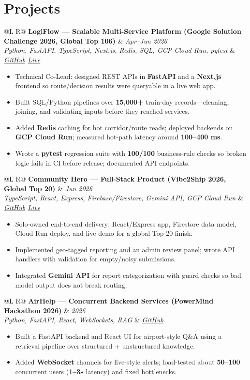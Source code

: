 \documentclass[a4paper,10pt]{article}
\makeatletter
\newcommand{\proj}[4]{%
  \vspace{1.2mm}
  \noindent\begin{tabularx}{\textwidth}{@{}L R@{}}
    \textbf{#1} & \textit{\small #2} \\
    \textit{\small #3} & \textit{\small #4} \\
  \end{tabularx}\par
  \vspace{0.4mm}%
}
\makeatother
\begin{document}
\section{Projects}
\proj{LogiFlow --- Scalable Multi-Service Platform (Google Solution Challenge 2026, Global Top 106)}{Apr--Jun 2026}
{Python, FastAPI, TypeScript, Next.js, Redis, SQL, GCP Cloud Run, pytest}
{\href{https://github.com/Ojas-Srivastava05/LogiFlow-Solution-Challenge-2026}{GitHub} \textbar{} \href{https://logi-flow-solution-challenge-2026.vercel.app}{Live}}
\begin{itemize}
  \item Technical Co-Lead: designed REST APIs in \textbf{FastAPI} and a \textbf{Next.js} frontend so route/decision results were queryable in a live web app.
  \item Built SQL/Python pipelines over \textbf{15,000+} train-day records---cleaning, joining, and validating inputs before they reached services.
  \item Added \textbf{Redis} caching for hot corridor/route reads; deployed backends on \textbf{GCP Cloud Run}; measured hot-path latency around \textbf{100--400 ms}.
  \item Wrote a \textbf{pytest} regression suite with \textbf{100/100} business-rule checks so broken logic fails in CI before release; documented API endpoints.
\end{itemize}

\proj{Community Hero --- Full-Stack Product (Vibe2Ship 2026, Global Top 20)}{Jun 2026}
{TypeScript, React, Express, Firebase/Firestore, Gemini API, GCP Cloud Run}
{\href{https://github.com/Ojas-Srivastava05/community-hero}{GitHub} \textbar{} \href{https://community-hero-987477089222.asia-south1.run.app}{Live}}
\begin{itemize}
  \item Solo-owned end-to-end delivery: React/Express app, Firestore data model, Cloud Run deploy, and live demo for a global Top-20 finish.
  \item Implemented geo-tagged reporting and an admin review panel; wrote API handlers with validation for empty/noisy submissions.
  \item Integrated \textbf{Gemini API} for report categorization with guard checks so bad model output does not break routing.
\end{itemize}

\proj{AirHelp --- Concurrent Backend Services (PowerMind Hackathon 2026)}{2026}
{Python, FastAPI, React, WebSockets, RAG}
{\href{https://github.com/Ojas-Srivastava05/AirHelp-AI-Airport-Assistant}{GitHub}}
\begin{itemize}
  \item Built a FastAPI backend and React UI for airport-style Q\&A using a retrieval pipeline over structured + unstructured knowledge.
  \item Added \textbf{WebSocket} channels for live-style alerts; load-tested about \textbf{50--100} concurrent users (\textbf{1--3s} latency) and fixed bottlenecks.
\end{itemize}
\end{document}

